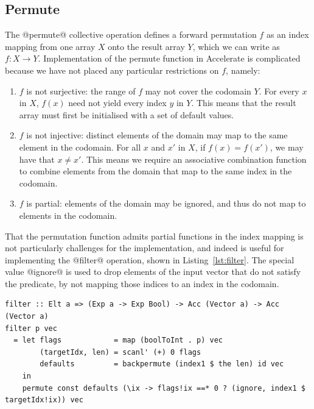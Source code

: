 \subsection{Permute}

The @permute@ collective operation defines a forward permutation $f$ as an
index mapping from one array $X$ onto the result array $Y$, which we can write
as  $f : X \rightarrow Y$. Implementation of the permute function in Accelerate
is complicated because we have not placed any particular restrictions on $f$,
namely:
%
\begin{enumerate}
    \item $f$ is not surjective: the range of $f$ may not cover the codomain
        $Y$. For every $x$ in $X$, $f\left( x \right)$ need not yield every
        index $y$ in $Y$. This means that the result array must first be
        initialised with a set of default values.

    \item $f$ is not injective: distinct elements of the domain may
        map to the same element in the codomain. For all $x$ and $x'$ in $X$, if
        $f\left( x \right) = f\left( x' \right)$, we may have that $x \ne x'$.
        This means we require an associative combination function to combine
        elements from the domain that map to the same index in the codomain.

    \item $f$ is partial: elements of the domain may be ignored, and thus do
        not map to elements in the codomain.
\end{enumerate}

That the permutation function admits partial functions in the index mapping is
not particularly challenges for the implementation, and indeed is useful for
implementing the @filter@ operation, shown in Listing~\ref{lst:filter}. The
special value @ignore@ is used to drop elements of the input vector that do
not satisfy the predicate, by not mapping those indices to an index in the
codomain.
%
\begin{lstlisting}[style=haskell
    ,label=lst:filter
    ,caption={[Filter in Accelerate] Filtering returns only those elements of a
    vector which satisfy a predicate. This operation is included as part of
    Accelerate's standard prelude.}]
filter :: Elt a => (Exp a -> Exp Bool) -> Acc (Vector a) -> Acc (Vector a)
filter p vec
  = let flags            = map (boolToInt . p) vec
        (targetIdx, len) = scanl' (+) 0 flags
        defaults         = backpermute (index1 $ the len) id vec
    in
    permute const defaults (\ix -> flags!ix ==* 0 ? (ignore, index1 $ targetIdx!ix)) vec
\end{lstlisting}

